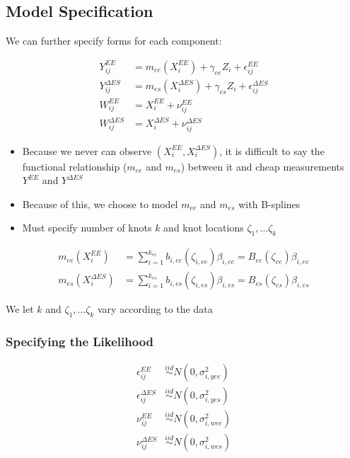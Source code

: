 \documentclass[handout]{beamer}\usepackage[]{graphicx}\usepackage[]{color}
\begin{document}
\subsection{Model Specification}

\begin{frame}
We can further specify forms for each component:

\begin{align}
Y_{ij}^{EE} &= m_{ee}(X_i^{EE}) + \gamma_{ee}Z_i + \epsilon_{ij}^{EE} \\
Y_{ij}^{\Delta ES} &= m_{es}(X_i^{\Delta ES}) + \gamma_{es}Z_i + \epsilon_{ij}^{\Delta ES} \\
W_{ij}^{EE} &= X_i^{EE} + \nu_{ij}^{EE} \\
W_{ij}^{\Delta ES} &= X_i^{\Delta ES} + \nu_{ij}^{\Delta ES}
\end{align}

\end{frame}

\begin{frame}
\begin{itemize}
\item
Because we never can observe $(X_i^{EE},X_i^{\Delta ES})$, it is difficult to say the functional relationship ($m_{ee}$ and $m_{es}$) between it and cheap measurements $Y^{EE}$ and $Y^{\Delta ES}$ 

\item
Because of this, we choose to model $m_{ee}$ and $m_{es}$ with B-splines
\item
Must specify number of knots $k$ and knot locations $\zeta_1,...\zeta_k$
\end{itemize}

\begin{align}
m_{ee}(X_i^{EE}) &= \sum_{i=1}^{k_{ee}} b_{i,ee}(\zeta_{i,ee}) \beta_{i,ee} = B_{ee}(\zeta_{ee}) \beta_{i,ee} \\
m_{es}(X_i^{\Delta ES}) &= \sum_{i=1}^{k_{es}} b_{i,es}(\zeta_{i,es}) \beta_{i,es} = B_{es}(\zeta_{es}) \beta_{i,es}
\end{align}

We let $k$ and $\zeta_1,...\zeta_k$ vary according to the data

\end{frame}

\begin{frame}
\frametitle{Specifying the Likelihood}

\begin{align}
\epsilon_{ij}^{EE} &\overset{iid}{\sim} N(0,\sigma_{i,yee}^2) \\
\epsilon_{ij}^{\Delta ES} &\overset{iid}{\sim} N(0,\sigma_{i,yes}^2) \\
\nu_{ij}^{EE} &\overset{iid}{\sim} N(0,\sigma_{i,wee}^2) \\
\nu_{ij}^{\Delta ES} &\overset{iid}{\sim} N(0,\sigma_{i,wes}^2) 
\end{align}

\end{frame}
\end{document}
